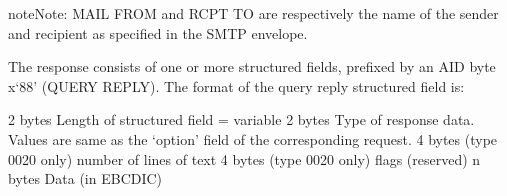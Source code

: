 \documentclass[letterpaper,10pt,english]{sphinxmanual}
\begin{document}
\begin{sphinxVerbatim}[commandchars=\\\{\}]
        
        
         
         
 
 
 
 
 
 
 
  
    
    
\end{sphinxVerbatim}


\begin{sphinxadmonition}{note}{Note:}
MAIL FROM and RCPT TO are respectively the name of the sender and recipient as specified in the SMTP envelope.
\end{sphinxadmonition}

The response consists of one or more structured fields, prefixed by an AID byte x‘88’ (QUERY REPLY). The format of the
query reply structured field is:

\begin{sphinxVerbatim}[commandchars=\\\{\}]
\PYGZhy{} 2 bytes Length of structured field = variable
\PYGZhy{} 2 bytes Type of response data.
Values are same as the ‘option’ field of the corresponding request.
\PYGZhy{} 4 bytes (type 0020 only) number of lines of text
\PYGZhy{} 4 bytes (type 0020 only) flags (reserved)
\PYGZhy{} n bytes Data (in EBCDIC)
\end{sphinxVerbatim}
\end{document}

